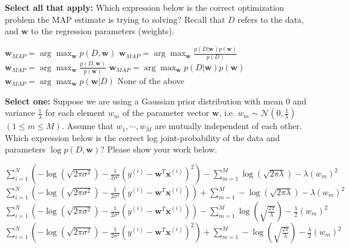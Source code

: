 \documentclass[11pt,addpoints,answers]{exam}
\newcommand{\sall}{\textbf{Select all that apply: }}
\newcommand{\sone}{\textbf{Select one: }}
\begin{document}
\begin{questions}
\begin{parts}
    \begin{subparts}
    \subpart[3] \sall Which expression below is the correct optimization problem the MAP estimate is trying to solving? Recall that $D$ refers to the data, and $\mathbf{w}$ to the regression parameters (weights).
    {\checkboxchar{$\Box$} \checkedchar{$\blacksquare$}
    \begin{checkboxes}
        \choice $\mathbf{w}_{MAP} = \arg\max_{\mathbf{w}} p(D, \mathbf{w})$
        \choice $\mathbf{w}_{MAP} = \arg\max_{\mathbf{w}} \frac{p(D| \mathbf{w})p(\mathbf{w})}{p(D)}$
        \choice $\mathbf{w}_{MAP} = \arg\max_{\mathbf{w}} \frac{p(D, \mathbf{w})}{p(\mathbf{w})}$
        \choice $\mathbf{w}_{MAP} = \arg\max_{\mathbf{w}} p(D| \mathbf{w})p(\mathbf{w})$
        \choice $\mathbf{w}_{MAP} = \arg\max_{\mathbf{w}} p(\mathbf{w}| D)$
        \choice None of the above
    \end{checkboxes}
    }
    

    \subpart[3] \sone Suppose we are using a Gaussian prior distribution with mean $0$ and variance $\frac{1}{\lambda}$ for each element $w_m$  of the parameter vector $\mathbf{w}$, i.e. $w_m \sim \mathcal{N}\left(0, \frac{1}{\lambda}\right)$ $(1 \leq m \leq M )$. Assume that $w_1, \cdots, w_M$ are mutually independent of each other. Which expression below is the correct log joint-probability of the data and parameters $\log p(D, \mathbf{w})$?  Please show your work below.
    \begin{checkboxes}
        \choice $\sum_{i=1}^N\left(-\log (\sqrt{2\pi\sigma^2}) - \frac{1}{2\sigma^2} (y^{(i)} - \mathbf{w}^T\mathbf{x}^{(i)})^2\right) - \sum_{m=1}^M \log(\sqrt{2\pi\lambda}) - \lambda (w_m)^2$
        \choice $\sum_{i=1}^N\left(-\log (\sqrt{2\pi\sigma^2}) - \frac{1}{2\sigma^2} (y^{(i)} - \mathbf{w}^T\mathbf{x}^{(i)})\right) + \sum_{m=1}^M -\log(\sqrt{2\pi\lambda}) - \lambda (w_m)^2$
        \choice $\sum_{i=1}^N\left(-\log (\sqrt{2\pi\sigma^2}) - \frac{1}{2\sigma^2} (y^{(i)} - \mathbf{w}^T\mathbf{x}^{(i)})\right) -  \sum_{m=1}^M \log(\sqrt{\frac{2\pi}{\lambda}}) - \frac{\lambda}{2}(w_m)^2$
        \choice $\sum_{i=1}^N\left(-\log (\sqrt{2\pi\sigma^2}) - \frac{1}{2\sigma^2} (y^{(i)} - \mathbf{w}^T\mathbf{x}^{(i)})^2\right) +  \sum_{m=1}^M -\log(\sqrt{\frac{2\pi}{\lambda}}) - \frac{\lambda}{2}(w_m)^2$
    \end{checkboxes}
    
     \begin{your_solution}[title=Work,height=8cm]
    \end{your_solution}
        

\end{subparts}
\end{parts}
\end{questions}
\end{document}
